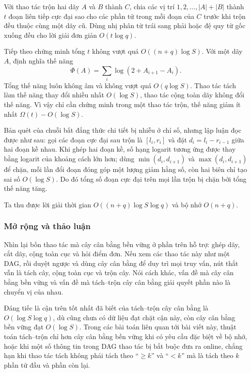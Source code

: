\documentclass[11pt]{article}
\begin{document}
Với thao tác trộn hai dãy $A$ và $B$ thành $C$, chia các vị trí
$1,2,\ldots,|A|+|B|$ thành $t$ đoạn liên tiếp cực đại sao cho các phần tử trong
mỗi đoạn của $C$ trước khi trộn đều thuộc cùng một dãy cũ. Dùng nhị phân từ trái
sang phải hoặc đệ quy từ gốc xuống đều cho lời giải đơn giản $O(t\log q)$.

Tiếp theo chứng minh tổng $t$ không vượt quá $O((n+q)\log S)$. Với một dãy $A$,
định nghĩa thế năng
\[
  \Phi(A)=\sum_i \log(2+A_{i+1}-A_i).
\]
Tổng thế năng luôn không âm và không vượt quá $O(q\log S)$. Thao tác tách làm
thế năng thay đổi nhiều nhất $O(\log S)$, thao tác cộng toàn dãy không đổi thế
năng. Vì vậy chỉ cần chứng minh trong một thao tác trộn, thế năng giảm ít nhất
$\Omega(t)-O(\log S)$.

Bản quét của chuỗi bất đẳng thức chi tiết bị nhiễu ở chỉ số, nhưng lập luận đọc
được như sau: gọi các đoạn cực đại sau trộn là $[l_i,r_i]$ và đặt
$d_i=l_i-r_{i-1}$ giữa hai đoạn kề nhau. Khi ghép hai đoạn kề, số hạng logarit
tương ứng được thay bằng logarit của khoảng cách lớn hơn; dùng
$\min(d_i,d_{i+1})$ và $\max(d_i,d_{i+1})$ để chặn, mỗi lần đổi đoạn đóng góp
một lượng giảm hằng số, còn hai biên chỉ tạo sai số $O(\log S)$. Do đó tổng số
đoạn cực đại trên mọi lần trộn bị chặn bởi tổng thế năng tăng.

Ta thu được lời giải thời gian $O((n+q)\log S\log q)$ và bộ nhớ $O(n+q)$.

\subsubsection{Mở rộng và thảo luận}

Nhìn lại bốn thao tác mà cây cân bằng bền vững ở phần trên hỗ trợ: ghép dãy, cắt
dãy, cộng toàn cục và hỏi điểm đơn. Nếu xem các thao tác này như một DAG, rồi
duyệt ngược và dùng cây cân bằng để duy trì mọi truy vấn, nút thắt vẫn là tách
cây, cộng toàn cục và trộn cây. Nói cách khác, vấn đề mà cây cân bằng bền vững
và vấn đề mà tách--trộn cây cân bằng giải quyết phần nào là chuyển vị của nhau.

Đáng tiếc là cận trên tốt nhất đã biết của tách--trộn cây cân bằng là
$O(\log S\log q)$, dù cũng chưa có dữ liệu đạt chặt cận này, còn cây cân bằng
bền vững đạt $O(\log S)$. Trong các bài toán liên quan tới bài viết này, thuật
toán tách--trộn chỉ hơn cây cân bằng bền vững khi có yêu cầu đặc biệt về bộ nhớ,
hoặc khi một số thông tin trong DAG thao tác bị bắt buộc đưa ra online, chẳng
hạn khi thao tác tách không phải tách theo ``$\ge k$'' và ``$<k$'' mà là tách
theo $k$ phần tử đầu và phần còn lại.
\end{document}
